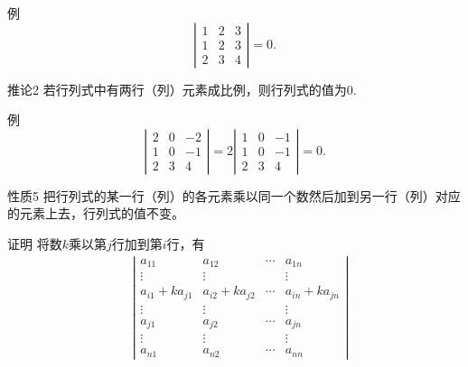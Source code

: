 \begin{frame}
  \begin{exampleblock}{例}
    $$
    \left|
    \begin{array}{ccc}
      1 & 2 & 3\\
      1 & 2 & 3\\
      2 & 3 & 4
    \end{array}
    \right| = 0.
    $$
  \end{exampleblock}
  \pause 
  \begin{block}{推论2}
    若行列式中有两行（列）元素成比例，则行列式的值为$0$.
  \end{block}
  \pause
  \begin{exampleblock}{例}
    $$
    \left|
    \begin{array}{ccc}
      2 & 0 & -2\\
      1 & 0 & -1\\
      2 & 3 & 4
    \end{array}
    \right| =2 \left|
    \begin{array}{ccc}
      1 & 0 & -1\\
      1 & 0 & -1\\
      2 & 3 & 4
    \end{array}
    \right| = 0.
    $$

  \end{exampleblock}
\end{frame}

\begin{frame}
  \begin{block}{性质5}
    把行列式的某一行（列）的各元素乘以同一个数然后加到另一行（列）对应的元素上去，行列式的值不变。
  \end{block}
  \pause
  \begin{block}{证明}
    将数$k$乘以第$j$行加到第$i$行，有
    $$
    \begin{array}{ll}
      & \left|
      \begin{array}{cccc}
        a_{11} & a_{12} & \cdots & a_{1n}\\
        \vdots & \vdots &  & \vdots \\
        a_{i1}+k a_{j1} & a_{i2}+k a_{j2} & \cdots & a_{in}+k a_{jn}\\
        \vdots & \vdots &  & \vdots \\
        a_{j1} & a_{j2} & \cdots & a_{jn}\\
        \vdots & \vdots &  & \vdots \\
        a_{n1} & a_{n2} & \cdots & a_{nn}
      \end{array}
      \right|
    \end{array}
    $$

  \end{block}
\end{frame}

